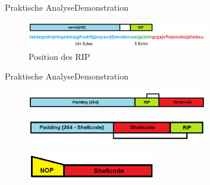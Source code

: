 \begin{frame}{Praktische Analyse}{Demonstration}
    \begin{figure}[h]
        \centering
        \includegraphics[width=0.7\textwidth,height=0.75\textheight,keepaspectratio]{images/characters.png}
        \caption{Position des RIP}
    \end{figure}
\end{frame}

\begin{frame}{Praktische Analyse}{Demonstration}
    \begin{figure}[h]
        \centering
        \includegraphics[width=0.7\textwidth,height=0.75\textheight,keepaspectratio]{images/payload1.png}
    \end{figure}
    \begin{figure}[h]
        \centering
        \includegraphics[width=0.7\textwidth,height=0.75\textheight,keepaspectratio]{images/payload2.png}
    \end{figure}
    \begin{figure}[h]
        \centering
        \includegraphics[width=0.5\textwidth,height=0.75\textheight,keepaspectratio]{images/nop.png}
    \end{figure}
\end{frame}

